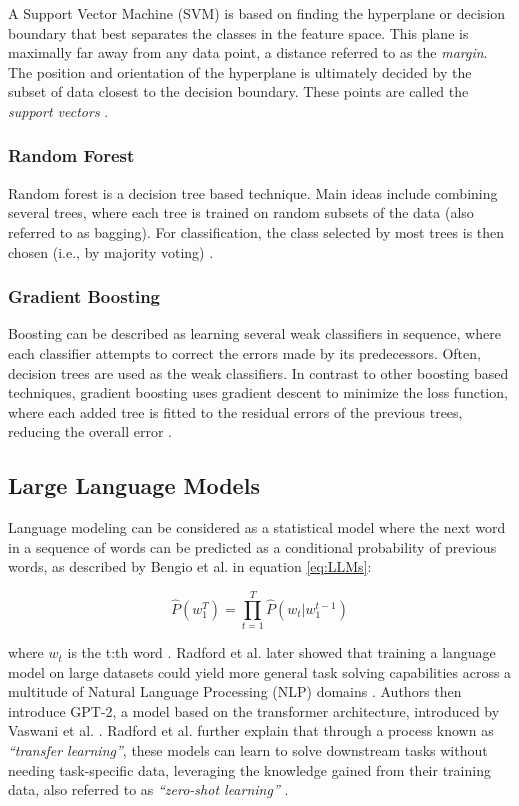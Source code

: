 A Support Vector Machine (SVM) is based on finding the hyperplane or decision boundary that best separates the classes in the feature space. This plane is maximally far away from any data point, a distance referred to as the \textit{margin}. The position and orientation of the hyperplane is ultimately decided by the subset of data closest to the decision boundary. These points are called the \textit{support vectors} \cite{Manning2008}. 

\subsubsection{Random Forest}

Random forest is a decision tree based technique. Main ideas include combining several trees, where each tree is trained on random subsets of the data (also referred to as bagging). For classification, the class selected by most trees is then chosen (i.e., by majority voting) \cite{smlbook}.

\subsubsection{Gradient Boosting}

Boosting can be described as learning several weak classifiers in sequence, where each classifier attempts to correct the errors made by its predecessors. Often, decision trees are used as the weak classifiers. In contrast to other boosting based techniques, gradient boosting uses gradient descent to minimize the loss function, where each added tree is fitted to the residual errors of the previous trees, reducing the overall error \cite{smlbook}.

\subsection{Large Language Models}

Language modeling can be considered as a statistical model where the next word in a sequence of words can be predicted as a conditional probability of previous words, as described by Bengio et al. in equation \ref{eq:LLMs}:

\begin{equation}
\label{eq:LLMs}
\hat{P}(w_1^T) = \prod_{t=1}^{T} \hat{P}(w_t | w_1^{t-1})
\end{equation}

where $w_t$ is the t:th word \cite{Bengio2003AModel}. Radford et al. later showed that training a language model on large datasets could yield more general task solving capabilities across a multitude of Natural Language Processing (NLP) domains \cite{Radford2019LanguageMA}. Authors then introduce GPT-2, a model based on the transformer architecture, introduced by Vaswani et al. \cite{Vaswani2017AttentionNeed}. Radford et al. further explain that through a process known as \textit{“transfer learning”}, these models can learn to solve downstream tasks without needing task-specific data, leveraging the knowledge gained from their training data, also referred to as \textit{“zero-shot learning”} \cite{Radford2019LanguageMA}.

